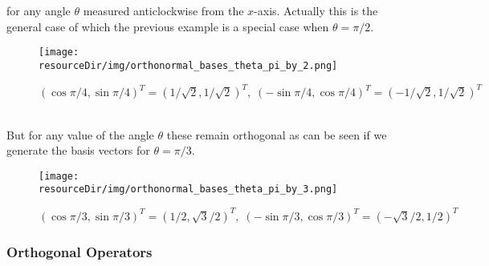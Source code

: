 \documentclass[MathsNotesBase.tex]{subfiles}
\begin{document}
{			for any angle $\theta$ measured anticlockwise from the $x$-axis. Actually this is the general case of which the previous example is a special case when ${ \theta = \pi / 2 }$.			
			\begin{figure}[h!]
				\texttt{[image: \\resourceDir/img/orthonormal\_bases\_theta\_pi\_by\_2.png]}
				\caption{$ (\cos{\pi/4}, \sin{\pi/4})^T = (1/\sqrt{2}, 1/\sqrt{2})^T,\;  (-\sin{\pi/4}, \cos{\pi/4})^T = (-1/\sqrt{2}, 1/\sqrt{2})^T $}
			\end{figure}
			\\But for any value of the angle $\theta$ these remain orthogonal as can be seen if we generate the basis vectors for ${ \theta = \pi/3 }$.
			\begin{figure}[h!]
				\texttt{[image: \\resourceDir/img/orthonormal\_bases\_theta\_pi\_by\_3.png]}
				\caption{$ (\cos{\pi/3}, \sin{\pi/3})^T = (1/2, \sqrt{3}/2)^T,\;  (-\sin{\pi/3}, \cos{\pi/3})^T = (-\sqrt{3}/2, 1/2)^T $}
			\end{figure}
	
		
		\bigskip\bigskip
		\subsubsection{Orthogonal Operators}
		\bigskip
	
}
\end{document}
